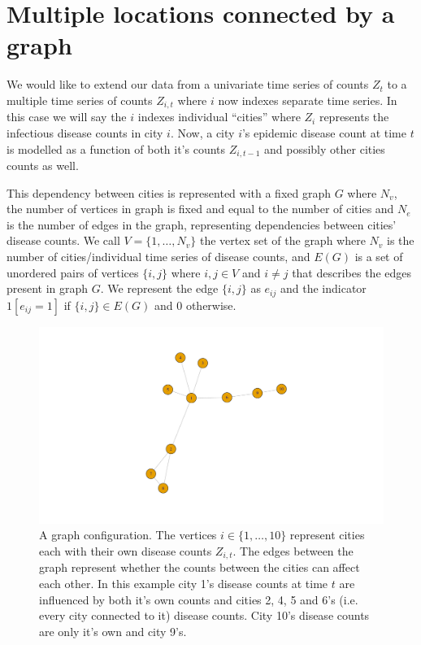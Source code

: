 \documentclass[]{article}
\numberwithin{equation}{section}
\begin{document}
\hypertarget{multiple-locations-connected-by-a-graph}{%
\section{Multiple locations connected by a
graph}\label{multiple-locations-connected-by-a-graph}}

We would like to extend our data from a univariate time series of counts
\(Z_t\) to a multiple time series of counts \(Z_{i,t}\) where \(i\) now
indexes separate time series. In this case we will say the \(i\) indexes
individual ``cities'' where \(Z_i\) represents the infectious disease
counts in city \(i\). Now, a city \(i\)'s epidemic disease count at time
\(t\) is modelled as a function of both it's counts \(Z_{i,t-1}\) and
possibly other cities counts as well.

This dependency between cities is represented with a fixed graph \(G\)
where \(N_v\), the number of vertices in graph is fixed and equal to the
number of cities and \(N_e\) is the number of edges in the graph,
representing dependencies between cities' disease counts. We call
\(V = \{1,\dots,N_v \}\) the vertex set of the graph where \(N_v\) is
the number of cities/individual time series of disease counts, and
\(E(G)\) is a set of unordered pairs of vertices \(\{i,j\}\) where
\(i,j \in V\) and \(i \neq j\) that describes the edges present in graph
\(G\). We represent the edge \(\{i,j\}\) as \(e_{ij}\) and the indicator
\(1[e_{ij}=1]\) if \(\{i,j\} \in E(G)\) and 0 otherwise.

\begin{figure}
\includegraphics[trim={1 2cm 0 2cm},clip]{thesis_draft_files/figure-latex/unnamed-chunk-1-1} \caption{\label{fig:graph example} A graph configuration. The vertices $i \in \{1,\dots, 10\}$ represent cities each with their own disease counts          $Z_{i,t}$. The edges between the graph represent whether the counts between the cities can affect each other. In this example city 1's disease counts at time $t$ are influenced by both it's own counts and cities 2, 4, 5 and 6's (i.e. every city connected to it) disease counts. City 10's disease counts are only it's own and city 9's.}\label{fig:unnamed-chunk-1}
\end{figure}
\end{document}
